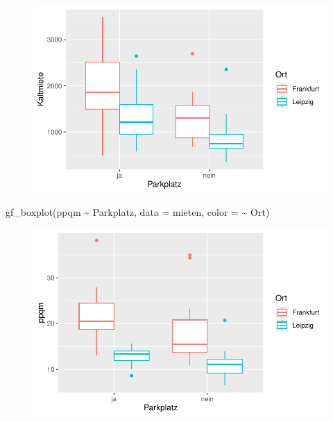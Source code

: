 \documentclass[
  a4paper,
  DIV=11]{scrartcl}
\newenvironment{Shaded}{\begin{snugshade}}{\end{snugshade}}
\newcommand{\AttributeTok}[1]{\textcolor[rgb]{0.40,0.45,0.13}{#1}}
\newcommand{\FunctionTok}[1]{\textcolor[rgb]{0.28,0.35,0.67}{#1}}
\newcommand{\NormalTok}[1]{\textcolor[rgb]{0.00,0.23,0.31}{#1}}
\newcommand{\SpecialCharTok}[1]{\textcolor[rgb]{0.37,0.37,0.37}{#1}}
\begin{document}
\begin{figure}[H]

{\centering \includegraphics{Mietmodellierung_files/figure-pdf/unnamed-chunk-12-1.pdf}

}

\end{figure}

\begin{Shaded}
\begin{Highlighting}[]
\FunctionTok{gf\_boxplot}\NormalTok{(ppqm }\SpecialCharTok{\textasciitilde{}}\NormalTok{ Parkplatz, }\AttributeTok{data =}\NormalTok{ mieten, }\AttributeTok{color =} \SpecialCharTok{\textasciitilde{}}\NormalTok{ Ort)}
\end{Highlighting}
\end{Shaded}

\begin{figure}[H]

{\centering \includegraphics{Mietmodellierung_files/figure-pdf/unnamed-chunk-12-2.pdf}

}

\end{figure}
\end{document}
